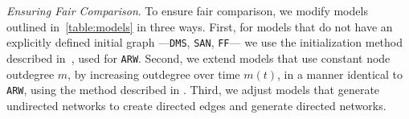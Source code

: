 %
%
%
%
%
%
%
%
%

\textit{Ensuring Fair Comparison}. To ensure fair comparison, we modify models outlined in~\cref{table:models} in three ways.
First, for models that do not have an explicitly defined initial graph ---\texttt{DMS}, \texttt{SAN}, \texttt{FF}--- we use the
initialization method described in~, used for \texttt{ARW}. Second, we extend
models that use constant node outdegree $m$, by increasing outdegree over time $m(t)$, in a manner identical to \texttt{ARW},
using the method described in . Third, we adjust models that generate undirected networks to
create directed edges and generate directed networks.

